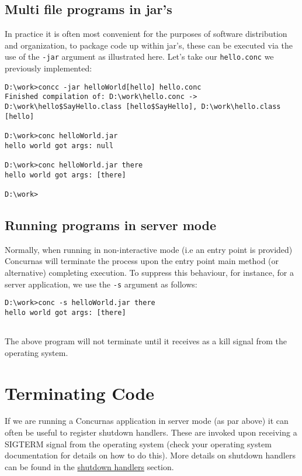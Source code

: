 \documentclass[conc-doc]{subfiles}
\begin{document}
\subsection{Multi file programs in jar's}
In practice it is often most convenient for the purposes of software distribution and organization, to package code up within jar's, these can be executed via the use of the \lstinline[language=None]{-jar} argument as illustrated here. Let's take our \lstinline[language=None]{hello.conc} we previously implemented:

\begin{lstlisting}[language=None]
D:\work>concc -jar helloWorld[hello] hello.conc
Finished compilation of: D:\work\hello.conc -> D:\work\hello$SayHello.class [hello$SayHello], D:\work\hello.class [hello]

D:\work>conc helloWorld.jar
hello world got args: null

D:\work>conc helloWorld.jar there
hello world got args: [there]

D:\work>
\end{lstlisting}


\subsection{Running programs in server mode}
Normally, when running in non-interactive mode (i.e an entry point is provided) Concurnas will terminate the process upon the entry point main method (or alternative) completing execution. To suppress this behaviour, for instance, for a server application, we use the  \lstinline[language=None]{-s} argument as follows:

\begin{lstlisting}[language=None]
D:\work>conc -s helloWorld.jar there
hello world got args: [there]


\end{lstlisting}

The above program will not terminate until it receives as a kill signal from the operating system.

\section{Terminating Code}
If we are running a Concurnas application in server mode (as par above) it can often be useful to register shutdown handlers. These are invoked upon receiving a SIGTERM signal from the operating system (check your operating system documentation for details on how to do this). More details on shutdown handlers can be found in the \hyperref[sec:shutdownHandle]{shutdown handlers} section. 
\end{document}

